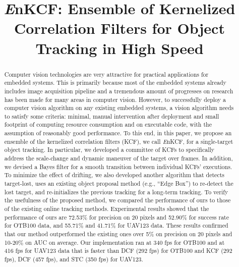 \documentclass{bmvc2k}
\title{ {\it E}nKCF: Ensemble of Kernelized Correlation Filters for Object Tracking in High Speed}
\begin{document}
\maketitle

\begin{abstract}
Computer vision technologies are very attractive for practical
applications for embedded systems. This is primarily because most of
the embedded systems already includes image acquisition pipeline and a
tremendous amount of progresses on research has been made for many
areas in computer vision. However, to successfully deploy a computer
vision algorithm on any existing embedded systems, a vision algorithm
needs to satisfy some criteria: minimal, manual intervention after
deployment and small footprint of computing resource consumption and
on executable code, with the assumption of reasonably good
performance. To this end, in this paper, we propose an ensemble of the
kernelized correlation filters (KCF), we call {\it E}nKCF, for a
single-target object tracking. In particular, we developed a committee
of KCFs to specifically address the scale-change and dynamic maneuver
of the target over frames. In addition, we devised a Bayes filter for
a smooth transition between individual KCFs' executions. To minimize
the effect of drifting, we also developed another algorithm that
detects target-lost, uses an existing object proposal method (e.g.,
``Edge Box'') to re-detect the lost target, and re-initializes the
previous tracking for a long-term tracking. To verify the usefulness
of the proposed method, we compared the performance of ours to those
of the existing online tracking methods. Experimental results showed
that the performance of ours are 72.53\% for precision on 20 pixels
and 52.90\% for success rate for OTB100 data, and 55.71\% and 41.71\%
for UAV123 data. These results confirmed that our method outperformed
the existing ones over 5\% on precision on 20 pixels and 10-20\% on
AUC on average. Our implementation ran at 340 fps for OTB100 and at
416 fps for UAV123 data that is faster than DCF (292 fps) for OTB100
and KCF (292 fps), DCF (457 fps), and STC (350 fps) for UAV123.
\end{abstract}

\end{document}
